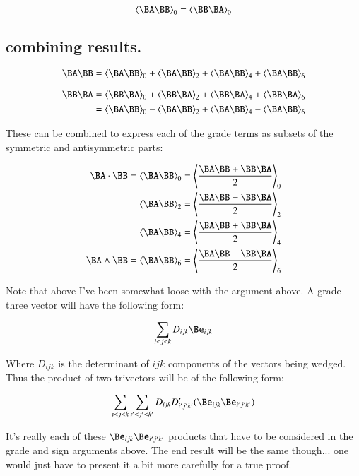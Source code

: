 \begin{equation}\label{eqn:trivector:trivecgpgrade0}
\gpgrade{\BA\BB}{0} = \gpgrade{\BB\BA}{0}
\end{equation}

\subsection{combining results. }

\begin{equation*}
\BA \BB
=\gpgrade{\BA\BB}{0}
+\gpgrade{\BA\BB}{2}
+\gpgrade{\BA\BB}{4}
+\gpgrade{\BA\BB}{6}
\end{equation*}

\begin{align*}
\BB\BA
&=\gpgrade{\BB\BA}{0}
+\gpgrade{\BB\BA}{2}
+\gpgrade{\BB\BA}{4}
+\gpgrade{\BB\BA}{6} \\
&=\gpgrade{\BA\BB}{0}
-\gpgrade{\BA\BB}{2}
+\gpgrade{\BA\BB}{4}
-\gpgrade{\BA\BB}{6} \\
\end{align*}

These can be combined to express each of the grade terms as subsets
of the symmetric and antisymmetric parts:

\begin{align*}
\BA \cdot \BB = \gpgrade{\BA\BB}{0} &= \gpgrade{\frac{\BA\BB + \BB\BA}{2}}{0} \\
\gpgrade{\BA\BB}{2} &= \gpgrade{\frac{\BA\BB - \BB\BA}{2}}{2} \\
\gpgrade{\BA\BB}{4} &= \gpgrade{\frac{\BA\BB + \BB\BA}{2}}{4} \\
\BA \wedge \BB = \gpgrade{\BA\BB}{6} &= \gpgrade{\frac{\BA\BB - \BB\BA}{2}}{6} \\
\end{align*}

Note that above I've been somewhat loose with the argument above.  A grade three vector
will have the following form:

\[
\sum_{i<j<k} D_{ijk} \Be_{ijk}
\]

Where $D_{ijk}$ is the determinant of $ijk$ components of the vectors being wedged.  Thus the product
of two trivectors will be of the following form:

\[
\sum_{i<j<k} \sum_{i'<j'<k'} D_{ijk} D'_{i'j'k'} (\Be_{ijk} \Be_{i'j'k'})
\]

It's really each of these $\Be_{ijk} \Be_{i'j'k'}$ products that have to be considered in the grade 
and sign arguments above.  The end result will be the same though... one would just have to present
it a bit more carefully for a true proof.

